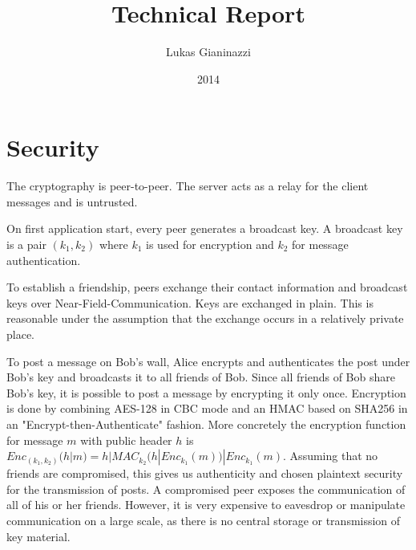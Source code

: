 \documentclass[a4paper,12pt]{article}
\author{Lukas Gianinazzi}
\title{Technical Report}
\date{2014}
\begin{document}
\maketitle


\section*{Security}

The cryptography is peer-to-peer. The server acts as a relay for the client messages and is untrusted.

On first application start, every peer generates a broadcast key. A broadcast key is a pair $(k_1, k_2)$ where $k_1$ is used for encryption and $k_2$ for message authentication.

To establish a friendship, peers exchange their contact information and broadcast keys over Near-Field-Communication. Keys are exchanged in plain. This is reasonable under the assumption that the exchange occurs in a relatively private place.

To post a message on Bob's wall, Alice encrypts and authenticates the post under Bob's key and broadcasts it to all friends of Bob. Since all friends of Bob share Bob's key, it is possible to post a message by encrypting it only once. Encryption is done by combining AES-128 in CBC mode and an HMAC based on SHA256 in an "Encrypt-then-Authenticate" fashion. More concretely the encryption function for message $m$ with public header $h$ is $Enc_{(k_1, k_2)}(h|m) = h | MAC_{k_2}(h | Enc_{k_1}(m)) | Enc_{k_1}(m)$.
Assuming that no friends are compromised, this gives us authenticity and chosen plaintext security for the transmission of posts. A compromised peer exposes the communication of all of his or her friends. However, it is very expensive to eavesdrop or manipulate communication on a large scale, as there is no central storage or transmission of key material.
\end{document}
